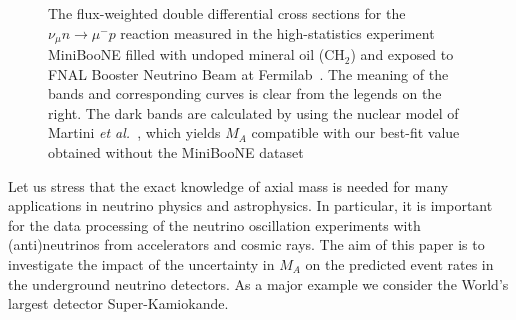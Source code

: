 \begin{figure}[h!]
\begin{center}
\caption{\label{MiniBooNE}The flux-weighted double differential cross sections for the $\nu_{\mu}n\to\mu^-p$ reaction measured in the high-statistics experiment MiniBooNE filled with undoped mineral oil (CH$_2$) and exposed to FNAL Booster Neutrino Beam at Fermilab~\cite{AguilarArevalo:2010zc}. The meaning of the bands and corresponding curves is clear from the legends on the right. The dark bands are calculated by using the nuclear model of Martini \textit{et al.}~\cite{Martini:2011wp}, which yields $M_A$ compatible with our best-fit value obtained without the MiniBooNE dataset}
\label{MiniBooNE}
\end{center}
\end{figure}

Let us stress that the exact knowledge of axial mass is needed for many applications in neutrino physics and astrophysics. In particular, it is important for the data processing of the neutrino oscillation experiments with (anti)neutrinos from accelerators and cosmic rays. The aim of this paper is to investigate the impact of the uncertainty in $M_A$ on the predicted event rates in the underground neutrino detectors. As a major example we consider the World's largest detector Super-Kamiokande.
